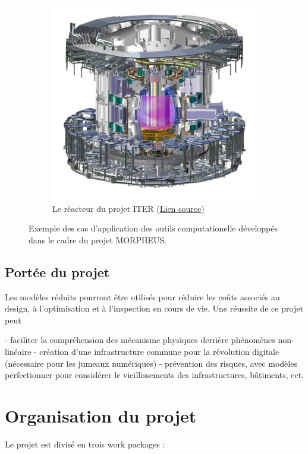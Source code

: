 \documentclass[french]{article}
\begin{document}
\begin{figure}[t]
\begin{subfigure}[t]{0.25\textwidth}
		\includegraphics[width=\columnwidth]{tcws.jpg}%
		\caption{Le réacteur du projet ITER (\href{https://www.iter.org/newsline/-/1119}{Lien source})}
		\label{fig:sofi-mit}
	\end{subfigure}
	\caption[]{Exemple des cas d'application des outils computationelle développés dans le cadre du projet MORPHEUS.}%
	\label{fig:applications}%
\end{figure}


\subsection{Portée du projet}

Les modèles réduits pourront être utilisés pour réduire les  co\^{u}ts associés au design, \`a l'optimisation et \`a l'inspection en cours de vie. Une réussite de ce projet peut 

- faciliter la compréhension des mécanisme physiques derrière phénomènes non-linéaire
- création d'une infrastructure commune pour la révolution digitale (nécessaire pour les jumeaux numériques)
- prévention des risques, avec modèles perfectionner pour considérer le vieillissements des infrastructures, bâtiments, ect.


\section{Organisation du projet}
Le projet est divisé en trois work packages :
\end{document}
